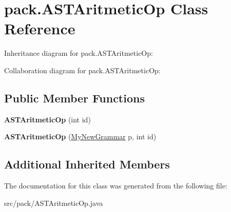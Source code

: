 \hypertarget{classpack_1_1_a_s_t_aritmetic_op}{}\section{pack.\+A\+S\+T\+Aritmetic\+Op Class Reference}
\label{classpack_1_1_a_s_t_aritmetic_op}


Inheritance diagram for pack.\+A\+S\+T\+Aritmetic\+Op\+:


Collaboration diagram for pack.\+A\+S\+T\+Aritmetic\+Op\+:
\subsection*{Public Member Functions}
\begin{DoxyCompactItemize}
\item 
{\bfseries A\+S\+T\+Aritmetic\+Op} (int id)\hypertarget{classpack_1_1_a_s_t_aritmetic_op_af61620d36e00409770e8e0039c7cd00a}{}\label{classpack_1_1_a_s_t_aritmetic_op_af61620d36e00409770e8e0039c7cd00a}

\item 
{\bfseries A\+S\+T\+Aritmetic\+Op} (\hyperlink{classpack_1_1_my_new_grammar}{My\+New\+Grammar} p, int id)\hypertarget{classpack_1_1_a_s_t_aritmetic_op_ae62cddd8f9ec8aa62ce3a5bb45da0b92}{}\label{classpack_1_1_a_s_t_aritmetic_op_ae62cddd8f9ec8aa62ce3a5bb45da0b92}

\end{DoxyCompactItemize}
\subsection*{Additional Inherited Members}


The documentation for this class was generated from the following file\+:\begin{DoxyCompactItemize}
\item 
src/pack/A\+S\+T\+Aritmetic\+Op.\+java\end{DoxyCompactItemize}
